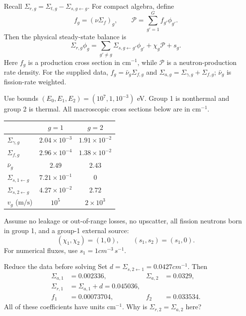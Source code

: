 \begin{handoutcolumns}
Recall $\Sigma_{r,g}=\Sigma_{t,g}-\Sigma_{s,g\gets g}$.
For compact algebra, define
\[
 f_g=(\nu\Sigma_f)_g,
 \qquad \mathcal P=\sum_{g'=1}^G f_{g'}\phi_{g'}.
\]
Then the physical steady-state balance is
\[
 \Sigma_{r,g}\phi_g=
 \sum_{g'\ne g}\Sigma_{s,g\gets g'}\phi_{g'}
       +\chi_g\mathcal P+s_g.
\]
Here $f_g$ is a production cross section in $\mathrm{cm^{-1}}$,
while $\mathcal P$ is a neutron-production rate density.
For the supplied data, $f_g=\bar\nu_g\Sigma_{f,g}$ and
$\Sigma_{a,g}=\Sigma_{\gamma,g}+\Sigma_{f,g}$; $\bar\nu_g$ is fission-rate weighted.

Use bounds $(E_0,E_1,E_2)=(10^7,1,10^{-3})$ eV.
Group 1 is nonthermal and group 2 is thermal.
All macroscopic cross sections below are in $\mathrm{cm^{-1}}$.
\begin{center}
\renewcommand{\arraystretch}{1.32}
\begin{tabular}{@{}lcc@{}}
\toprule
 & $g=1$ & $g=2$\\
\midrule
$\Sigma_{\gamma,g}$ & $2.04\times10^{-3}$ & $1.91\times10^{-2}$\\
$\Sigma_{f,g}$ & $2.96\times10^{-4}$ & $1.38\times10^{-2}$\\
$\bar\nu_g$ & $2.49$ & $2.43$\\
$\Sigma_{s,1\gets g}$ & $7.21\times10^{-1}$ & $0$\\
$\Sigma_{s,2\gets g}$ & $4.27\times10^{-2}$ & $2.72$\\
$v_g$ ($\mathrm{m/s}$) & $10^5$ & $2\times10^3$\\
\bottomrule
\end{tabular}
\end{center}
Assume no leakage or out-of-range losses, no upscatter, all
fission neutrons born in group 1, and a group-1 external source:
\[
 (\chi_1,\chi_2)=(1,0),\qquad(s_1,s_2)=(s_1,0).
\]
For numerical fluxes, use $\boxed{s_1=1\unit{cm^{-3}\,s^{-1}}}$.
\begin{boardbox}{Reduce the data before solving}
Set $d=\Sigma_{s,2\gets1}=0.0427\unit{cm^{-1}}$. Then
\begin{align*}
 \Sigma_{a,1}&=0.002336,&\Sigma_{a,2}&=0.0329,\\
 \Sigma_{r,1}&=\Sigma_{a,1}+d=0.045036,\\
 f_1&=0.00073704,&f_2&=0.033534.
\end{align*}
All of these coefficients have units $\mathrm{cm^{-1}}$.
Why is $\Sigma_{r,2}=\Sigma_{a,2}$ here?
\end{boardbox}


\end{handoutcolumns}
